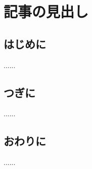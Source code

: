 \documentclass{word}
\subtitle{ヘッダの見出し}
\author{ほげ}
\begin{document}
\chapter{記事の見出し}

\section{はじめに}
......
\section{つぎに}
......
\section{おわりに}
......
\end{document}

